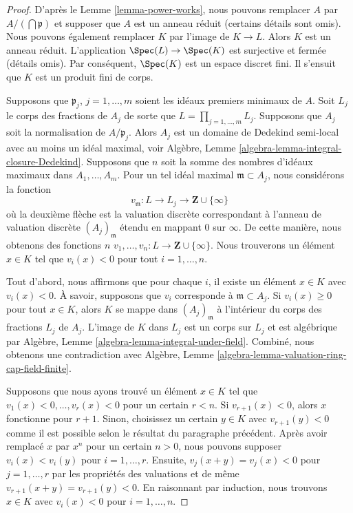 \begin{proof}
D'après le Lemme \ref{lemma-power-works}, nous pouvons remplacer
$A$ par $A/(\bigcap \mathfrak p)$ et supposer que $A$ est un
anneau réduit (certains détails sont omis). Nous pouvons
également remplacer $K$ par l'image de $K \to L$. Alors $K$ est un
anneau réduit. L'application $\Spec(L) \to \Spec(K)$ est
surjective et fermée (détails omis). Par conséquent, $\Spec(K)$ est un
espace discret fini. Il s'ensuit que $K$ est un produit fini de corps.

\medskip\noindent
Supposons que $\mathfrak p_j$, $j = 1, \ldots, m$ soient
les idéaux premiers minimaux de $A$. Soit $L_j$ le corps
des fractions de $A_j$ de sorte que $L = \prod_{j = 1,
\ldots, m} L_j$. Supposons que $A_j$ soit la
normalisation de $A/\mathfrak p_j$. Alors $A_j$ est un
domaine de Dedekind semi-local avec au moins un idéal
maximal, voir Algèbre, Lemme
\ref{algebra-lemma-integral-closure-Dedekind}. Supposons que $n$ soit la
somme des nombres d'idéaux maximaux dans $A_1, \ldots, A_m$. Pour un
tel idéal maximal $\mathfrak m \subset A_j$, nous considérons la fonction
$$
v_{\mathfrak m} : L \to L_j \to \mathbf{Z} \cup \{\infty\}
$$
où la deuxième flèche est la valuation discrète
correspondant à l'anneau de valuation discrète
$(A_j)_{\mathfrak m}$ étendu en mappant $0$ sur $\infty$. De
cette manière, nous obtenons des fonctions $n$ $v_1, \ldots,
v_n : L \to \mathbf{Z} \cup \{\infty\}$. Nous trouverons un
élément $x \in K$ tel que $v_i(x) < 0$ pour tout $i = 1, \ldots, n$.

\medskip\noindent
Tout d'abord, nous affirmons que pour chaque $i$, il existe
un élément $x \in K$ avec $v_i(x) < 0$. À savoir, supposons
que $v_i$ corresponde à $\mathfrak m \subset A_j$. Si $v_i(x)
\geq 0$ pour tout $x \in K$, alors $K$ se mappe dans
$(A_j)_{\mathfrak m}$ à l'intérieur du corps des fractions
$L_j$ de $A_j$. L'image de $K$ dans $L_j$ est un corps sur $L_j$
et est algébrique par Algèbre, Lemme
\ref{algebra-lemma-integral-under-field}. Combiné, nous obtenons une
contradiction avec Algèbre, Lemme \ref{algebra-lemma-valuation-ring-cap-field-finite}.

\medskip\noindent
Supposons que nous ayons trouvé un élément $x \in K$ tel que
$v_1(x) < 0, \ldots, v_r(x) < 0$ pour un certain $r < n$. Si $v_{r
+ 1}(x) < 0$, alors $x$ fonctionne pour $r + 1$. Sinon, choisissez
un certain $y \in K$ avec $v_{r + 1}(y) < 0$ comme il est possible
selon le résultat du paragraphe précédent. Après avoir remplacé $x$
par $x^n$ pour un certain $n > 0$, nous pouvons supposer $v_i(x) <
v_i(y)$ pour $i = 1, \ldots, r$. Ensuite, $v_j(x + y) = v_j(x) < 0$
pour $j = 1, \ldots, r$ par les propriétés des valuations et de même
$v_{r + 1}(x + y) = v_{r + 1}(y) < 0$. En raisonnant par induction,
nous trouvons $x \in K$ avec $v_i(x) < 0$ pour $i = 1, \ldots, n$.


\end{proof}

